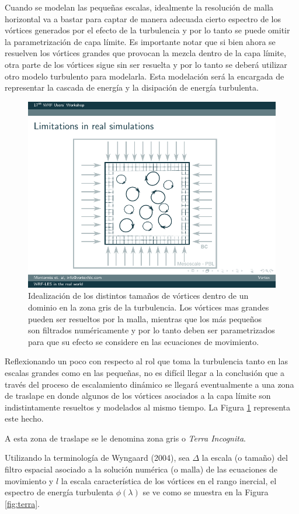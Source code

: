 Cuando se modelan las pequeñas escalas, idealmente la resolución de malla horizontal va a bastar para captar de manera adecuada cierto espectro de los vórtices generados por el efecto de la turbulencia y por lo tanto se puede omitir la parametrización de capa límite. Es importante notar que si bien ahora se resuelven los vórtices grandes que provocan la mezcla dentro de la capa límite, otra parte de los vórtices sigue sin ser resuelta y por lo tanto se deberá utilizar otro modelo turbulento para modelarla. Esta modelación será la encargada de representar la cascada de energía y la disipación de energía turbulenta.

\begin{figure}[h!]
	\centering
	\includegraphics[width=0.5\linewidth,trim={2.67cm 1.05cm 3.1cm 1.98cm},clip]{Imagenes/01/grid}
	\caption{Idealización de los distintos tamaños de vórtices dentro de un dominio en la zona gris de la turbulencia. Los vórtices mas grandes pueden ser resueltos por la malla, mientras que los más pequeños son filtrados numéricamente y por lo tanto deben ser parametrizados para que su efecto se considere en las ecuaciones de movimiento.}
	\label{fig:01grid}
\end{figure}

Reflexionando un poco con respecto al rol que toma la turbulencia tanto en las escalas grandes como en las pequeñas, no es difícil llegar a la conclusión que a través del proceso de escalamiento dinámico se llegará eventualmente a una zona de traslape en donde algunos de los vórtices asociados a la capa límite son indistintamente resueltos y modelados al mismo tiempo. La Figura \ref{fig:01grid} representa este hecho. 

A esta zona de traslape se le denomina zona gris o \emph{Terra Incognita}.

Utilizando la terminología de Wyngaard (2004), sea $\Delta$ la escala (o tamaño) del filtro espacial asociado a la solución numérica (o malla) de las ecuaciones de movimiento y $l$ la escala característica de los vórtices en el rango inercial, el espectro de energía turbulenta $\phi(\lambda)$ se ve como se muestra en la Figura \ref{fig:terra}.


